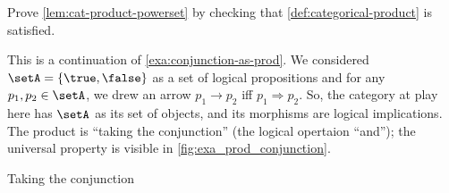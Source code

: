 \begin{gradedexercise}
    \label{ex:CatProductPowerset}
    Prove \cref{lem:cat-product-powerset} by checking that \cref{def:categorical-product} is satisfied.
\end{gradedexercise}


\begin{example}
    \label{exa:conjunction-as-prod-cont}
    This is a continuation of \cref{exa:conjunction-as-prod}. We considered $\setA = \{ \true, \false \}$ as a set of logical propositions and for any $p_1, p_2  \in \setA$, we drew an arrow $p_1 \to p_2$ iff $p_1 \Rightarrow p_2$. So, the category at play here has $\setA$ as its set of objects, and its morphisms are logical implications. The product is ``taking the conjunction'' (the logical opertaion ``and''); the universal property is visible in \cref{fig:exa_prod_conjunction}.
    \begin{marginfigure}
        \centering
        \caption{Taking the conjunction}
        \label{fig:exa_prod_conjunction_cont}
    \end{marginfigure}
\end{example}



